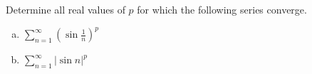 Determine all real values of $p$ for which the following series converge.

\begin{enumerate}[(a)]
\item $\displaystyle{\sum_{n=1}^{\infty} \left( \sin \frac{1}{n} \right)^p}$
\item $\displaystyle{\sum_{n=1}^{\infty} \left| \sin n           \right|^p}$
\end{enumerate}
